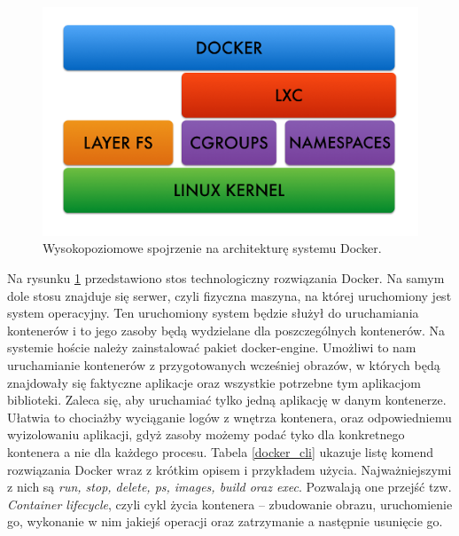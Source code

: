 \documentclass[10pt,a4paper,titlepage,twoside]{report}
\begin{document}
\begin{figure}[ht!]
	\centering
	\includegraphics[scale=0.7]{pics/docker_arch.png}
	\caption{Wysokopoziomowe spojrzenie na architekturę systemu Docker.}
	\label{docker_arch}
\end{figure}

Na rysunku \ref{docker_arch} przedstawiono stos technologiczny rozwiązania Docker. Na samym dole stosu znajduje się serwer, czyli fizyczna maszyna, na której uruchomiony jest system operacyjny. Ten uruchomiony system będzie służył do uruchamiania kontenerów i to jego zasoby będą wydzielane dla poszczególnych kontenerów. Na systemie hoście należy zainstalować pakiet docker-engine. Umożliwi to nam uruchamianie kontenerów z przygotowanych wcześniej obrazów, w których będą znajdowały się faktyczne aplikacje oraz wszystkie potrzebne tym aplikacjom biblioteki. Zaleca się, aby uruchamiać tylko jedną aplikację w danym kontenerze. Ułatwia to chociażby wyciąganie logów z wnętrza kontenera, oraz odpowiedniemu wyizolowaniu aplikacji, gdyż zasoby możemy podać tyko dla konkretnego kontenera a nie dla każdego procesu. Tabela \ref{docker_cli} ukazuje listę komend rozwiązania Docker wraz z krótkim opisem i przykładem użycia. Najważniejszymi z nich są \textit{run, stop, delete, ps, images, build oraz exec}. Pozwalają one przejść tzw. \textit{Container lifecycle}, czyli cykl życia kontenera – zbudowanie obrazu, uruchomienie go, wykonanie w nim jakiejś operacji oraz zatrzymanie a następnie usunięcie go.
\end{document}
